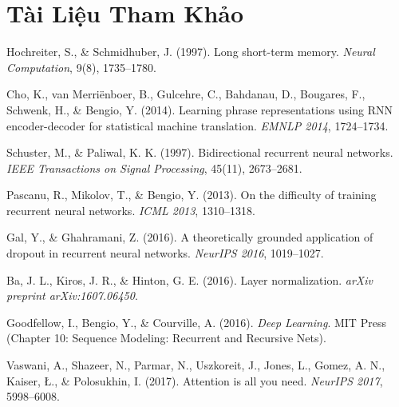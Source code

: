 \documentclass[12pt,a4paper]{report}
\begin{document}
\newpage

\chapter*{Tài Liệu Tham Khảo}

\begin{enumerate}[leftmargin=1.5cm, label={[\arabic*]}]
    \item Hochreiter, S., \& Schmidhuber, J. (1997). Long short-term memory. \textit{Neural Computation}, 9(8), 1735--1780.
    \item Cho, K., van Merriënboer, B., Gulcehre, C., Bahdanau, D., Bougares, F., Schwenk, H., \& Bengio, Y. (2014). Learning phrase representations using RNN encoder-decoder for statistical machine translation. \textit{EMNLP 2014}, 1724--1734.
    \item Schuster, M., \& Paliwal, K. K. (1997). Bidirectional recurrent neural networks. \textit{IEEE Transactions on Signal Processing}, 45(11), 2673--2681.
    \item Pascanu, R., Mikolov, T., \& Bengio, Y. (2013). On the difficulty of training recurrent neural networks. \textit{ICML 2013}, 1310--1318.
    \item Gal, Y., \& Ghahramani, Z. (2016). A theoretically grounded application of dropout in recurrent neural networks. \textit{NeurIPS 2016}, 1019--1027.
    \item Ba, J. L., Kiros, J. R., \& Hinton, G. E. (2016). Layer normalization. \textit{arXiv preprint arXiv:1607.06450}.
    \item Goodfellow, I., Bengio, Y., \& Courville, A. (2016). \textit{Deep Learning}. MIT Press (Chapter 10: Sequence Modeling: Recurrent and Recursive Nets).
    \item Vaswani, A., Shazeer, N., Parmar, N., Uszkoreit, J., Jones, L., Gomez, A. N., Kaiser, Ł., \& Polosukhin, I. (2017). Attention is all you need. \textit{NeurIPS 2017}, 5998--6008.
\end{enumerate}
\end{document}
